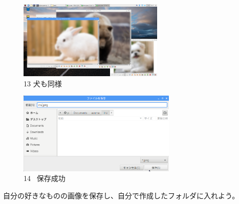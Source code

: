 \documentclass[a4paper,12pt]{jarticle}
\begin{document}
\begin{figure}[t]
  \begin{minipage}{\textwidth}
    \begin{minipage}{7.22cm}
      \includegraphics[width=6.911cm,height=3.729cm]{textbook-img105.png}\\
      13 犬も同様
    \end{minipage}
    \begin{minipage}{2.582cm}
    \end{minipage}
    \begin{minipage}{7.665cm}
      \includegraphics[width=7.527cm,height=3.905cm]{textbook-img104.png}\\
      14 \ 保存成功
    \end{minipage}
  \end{minipage}


  \centering
\end{figure}

\bigskip

\theQuestion\label{Q:hasAnswer02-6}

自分の好きなものの画像を保存し、自分で作成したフォルダに入れよう。

\clearpage
\end{document}
